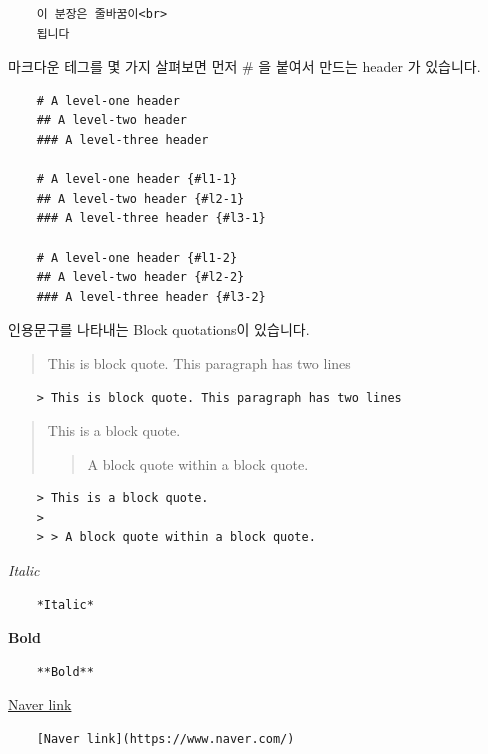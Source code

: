 \documentclass[
  a4paper,
]{book}
\begin{document}
\begin{verbatim}
    이 분장은 줄바꿈이<br>
    됩니다
\end{verbatim}

마크다운 테그를 몇 가지 살펴보면 먼저 \# 을 붙여서 만드는 header 가
있습니다.

\begin{verbatim}
    # A level-one header
    ## A level-two header
    ### A level-three header

    # A level-one header {#l1-1}
    ## A level-two header {#l2-1}
    ### A level-three header {#l3-1}

    # A level-one header {#l1-2}
    ## A level-two header {#l2-2}
    ### A level-three header {#l3-2}
\end{verbatim}

인용문구를 나타내는 Block quotations이 있습니다.

\begin{quote}
This is block quote. This paragraph has two lines
\end{quote}

\begin{verbatim}
    > This is block quote. This paragraph has two lines
\end{verbatim}

\begin{quote}
This is a block quote.

\begin{quote}
A block quote within a block quote.
\end{quote}
\end{quote}

\begin{verbatim}
    > This is a block quote.
    >
    > > A block quote within a block quote.
\end{verbatim}

\emph{Italic}

\begin{verbatim}
    *Italic*
\end{verbatim}

\textbf{Bold}

\begin{verbatim}
    **Bold**
\end{verbatim}

\href{https://www.naver.com/}{Naver link}

\begin{verbatim}
    [Naver link](https://www.naver.com/)
\end{verbatim}
\end{document}
